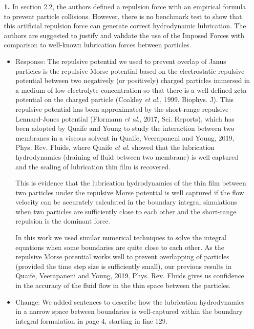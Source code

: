 \documentclass[11pt]{article}
\newcommand{\comment}[1]{{\color{blue} #1}}
\begin{document}
\noindent
\comment{{\bf 1.} In section 2.2, the authors defined a repulsion force with an
empirical formula to prevent particle collisions. However, there is no
benchmark test to show that this artificial repulsion force can generate
correct hydrodynamic lubrication. The authors are suggested to justify
and validate the use of the Imposed Forces with comparison to well-known
lubrication forces between particles.}
\begin{itemize}
  \item Response: The repulsive potential we used to prevent overlap of Janus particles is the repulsive Morse potential based on the electrostatic repulsive potential between two negatively (or positively) charged particles immersed in a medium of low electrolyte concentration so that there is a well-defined zeta potential on the charged particle (Coakley {\sl et al.}, 1999, Biophys. J). This repulsive potential has been approximated by the short-range repulsive Lennard-Jones potential (Flormann {\sl et al.}, 2017, Sci. Reports), which has been adopted by Quaife and Young to study the interaction between two membranes in a viscous solvent in Quaife, Veerapaneni and Young, 2019, Phys. Rev. Fluids, where Quaife {\sl et al.} showed that the lubrication hydrodynamics (draining of fluid between two membrane) is well captured and the scaling of lubrication thin film is recovered. 
  
This is evidence that the lubrication hydrodynamics of the thin film between two particles under the repulsive Morse potential is well captured  if the flow velocity can be accurately calculated in the boundary integral simulations when two particles are sufficiently close to each other and the short-range repulsion is the dominant force. 

In this work we used similar numerical techniques to solve the integral equations when some boundaries are quite close to each other.  As the repulsive Morse potential works well to prevent overlapping of particles (provided the time step size is sufficiently small), our previous results in Quaife, Veerapaneni and Young, 2019, Phys. Rev. Fluids gives us confidence in the accuracy of the fluid flow in the thin space between the particles.

\item Change: We added sentences to describe how the lubrication hydrodynamics in a narrow space between boundaries is well-captured within the boundary integral formulation in page 4, starting in line 129.

\end{itemize}
\end{document}
